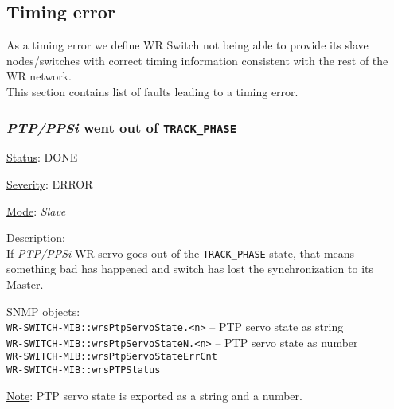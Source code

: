 \subsection{Timing error}
As a timing error we define WR Switch not being able to provide its slave
nodes/switches with correct timing information consistent with the rest of the
WR network.\\

This section contains list of faults leading to a timing error.

\subsubsection{\bf \emph{PTP/PPSi} went out of \texttt{TRACK\_PHASE}}
		\label{fail:timing:ppsi_track_phase}
		\begin{packed_enum}
			\item [] \underline{Status}: DONE
			\item [] \underline{Severity}: ERROR
			\item [] \underline{Mode}: \emph{Slave}
			\item [] \underline{Description}:\\
				If \emph{PTP/PPSi} WR servo goes out of the \texttt{TRACK\_PHASE} state,
				that means something bad has happened and switch has lost the
				synchronization to its Master.
			\item [] \underline{SNMP objects}:\\
				\texttt{WR-SWITCH-MIB::wrsPtpServoState.<n>} -- PTP servo state as string\\
				\texttt{WR-SWITCH-MIB::wrsPtpServoStateN.<n>} -- PTP servo state as number\\
				\texttt{WR-SWITCH-MIB::wrsPtpServoStateErrCnt}\\
				\texttt{WR-SWITCH-MIB::wrsPTPStatus}
			\item [] \underline{Note}: PTP servo state is exported as a string and a number.
		\end{packed_enum}

